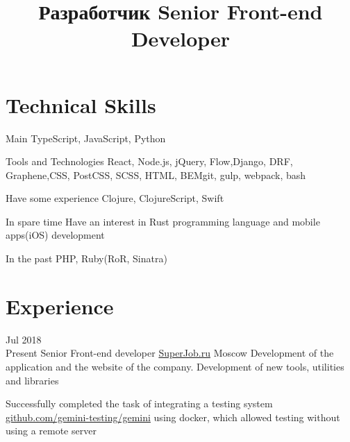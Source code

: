 \documentclass[11pt,a4paper,sans]{moderncv}
\title
    {\lang
        {Разработчик}
        {Senior Front-end Developer}}
\newcommand{\lang}[2]{#2}
\begin{document}
\maketitle

\section
    {\lang
        {Технические навыки}
        {Technical Skills}}

\cvline
    {\lang
        {Главное}
        {Main}}
    {TypeScript, JavaScript, Python}

\cvline
    {\lang
        {Использую инструменты и технологии}
        {Tools and Technologies}}
    {React, Node.js, jQuery, Flow,{\newline}Django, DRF, Graphene,{\newline}CSS, PostCSS, SCSS, HTML, BEM{\newline}git, gulp, webpack, bash}

\cvline
    {\lang
        {Имею небольшой опыт}
        {Have some experience}}
    {Clojure, ClojureScript, Swift}

\cvline
    {\lang
        {В свободное время}
        {In spare time}}
    {\lang
        {интересуюсь Rust}
        {Have an interest in Rust programming language and mobile apps(iOS) development}\newline}

\cvline
    {\lang
        {В прошлом}
        {In the past}}
    {PHP, Ruby(RoR, Sinatra)}

\section
    {\lang
        {Опыт работы}
        {Experience}}





\cventry
    {\lang{Июл}{Jul} 2018\\\lang{по н.в.}{Present}}
    {\lang
        {Фронтенд разработчик}
        {Senior Front-end developer}}
    {\href{https://superjob.ru}{SuperJob.ru}}
    {\lang
        {Москва}
        {Moscow}}
    {}
    {\lang
        {Разработка и поддержка сайта компании, создание новых инструментов, утилит и библиотек}
        {Development of the application and the website of the company. Development of new tools, utilities and libraries}}

\cvlistitem
    {\lang
        {Успешно реализовал задачу по интеграции системы тестирования gemini(\href{https://github.com/gemini-testing/gemini}{github.com/gemini-testing/gemini}) используя docker, что позволило проводить тестирование без использования удаленного сервера}
        {Successfully completed the task of integrating a testing system \href{https://github.com/gemini-testing/gemini}{github.com/gemini-testing/gemini} using docker, which allowed testing without using a remote server}\\}
\end{document}
